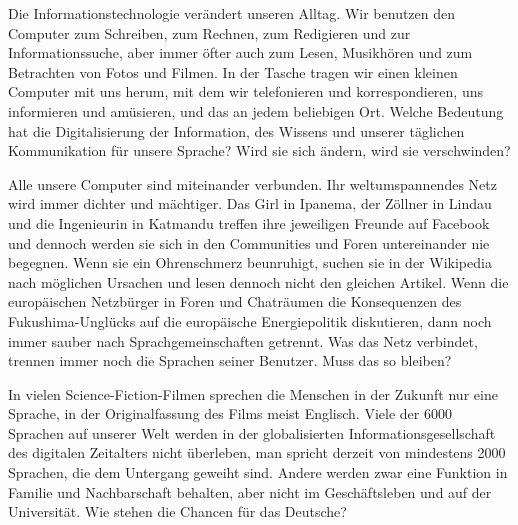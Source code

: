 \begin{multicols}{2}

Die Informationstechnologie verändert unseren Alltag. Wir benutzen den Computer zum Schreiben, zum Rechnen, zum Redigieren und zur Informationssuche, aber immer öfter auch zum Lesen, Musikhören und zum Betrachten von Fotos und Filmen.  In der Tasche tragen wir einen kleinen Computer mit uns herum, mit dem wir telefonieren und korrespondieren, uns informieren und amüsieren, und das an jedem beliebigen Ort. Welche Bedeutung hat die Digitalisierung der Information, des Wissens und unserer täglichen Kommunikation für unsere Sprache? Wird sie sich ändern, wird sie verschwinden?

Alle unsere Computer sind miteinander verbunden. Ihr weltumspannendes Netz wird immer dichter und mächtiger.  Das Girl in Ipanema, der Zöllner in Lindau und die Ingenieurin in Katmandu treffen ihre jeweiligen Freunde auf Facebook und dennoch werden sie  sich in den Communities und Foren untereinander nie begegnen.  Wenn sie ein Ohrenschmerz beunruhigt, suchen sie in der Wikipedia nach möglichen Ursachen und lesen dennoch nicht den gleichen Artikel.  Wenn die europäischen Netzbürger in Foren und Chaträumen die Konsequenzen des Fukushima-Unglücks auf die europäische Energiepolitik diskutieren, dann noch immer sauber nach Sprachgemeinschaften getrennt. Was das Netz verbindet, trennen immer noch die Sprachen seiner Benutzer. Muss das so bleiben?


In vielen Science-Fiction-Filmen sprechen die Menschen in der Zukunft nur eine Sprache, in der Originalfassung des Films meist Englisch. 
Viele der 6000 Sprachen auf unserer Welt werden in der globalisierten Informationsgesellschaft des digitalen Zeitalters nicht überleben, man spricht derzeit von mindestens 2000 Sprachen, die dem Untergang geweiht sind. Andere werden zwar eine Funktion in Familie und Nachbarschaft behalten, aber nicht im Geschäftsleben und auf der Universität. Wie stehen die Chancen für das Deutsche? 


\end{multicols}
